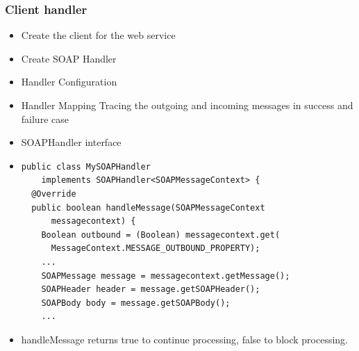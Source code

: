 \documentclass[10pt,xcolor=pdflatex]{beamer}
\begin{document}
\begin{frame}[containsverbatim]\frametitle{Client handler}
\begin{itemize}
	\item Create the client for the web service
	\item Create SOAP Handler
	\item Handler Configuration
	\item Handler Mapping Tracing the outgoing and incoming messages in success and failure case
	\item SOAPHandler interface
    \item[] \begin{footnotesize}\begin{verbatim}
public class MySOAPHandler 
    implements SOAPHandler<SOAPMessageContext> {
  @Override
  public boolean handleMessage(SOAPMessageContext 
      messagecontext) {
    Boolean outbound = (Boolean) messagecontext.get(
      MessageContext.MESSAGE_OUTBOUND_PROPERTY);
    ...
    SOAPMessage message = messagecontext.getMessage();
    SOAPHeader header = message.getSOAPHeader();
    SOAPBody body = message.getSOAPBody();
    ...
\end{verbatim}
\end{footnotesize}
  \item handleMessage returns true to continue processing, false to block processing.
\end{itemize}
\end{frame}
\end{document}
